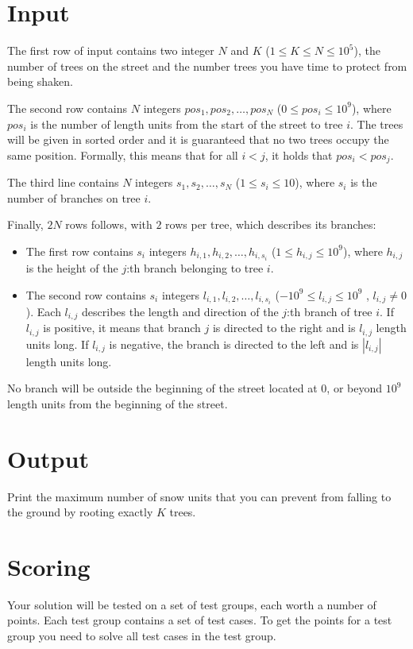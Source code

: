\section*{Input}
\noindent
The first row of input contains two integer $N$ and $K$ ($1 \leq K \leq N \leq 10^5$), the number of
trees on the street and the number trees you have time to protect from being shaken.

The second row contains $N$ integers $pos_1, pos_2, \dots, pos_N$ ($0 \leq pos_i \leq 10^9$), where
$pos_i$ is the number of length units from the start of the street to tree $i$.
The trees will be given in sorted order and it is guaranteed that no two trees occupy the same position.
Formally, this means that for all $i<j$, it holds that $pos_i < pos_j$.

The third line contains $N$ integers $s_1, s_2, \dots, s_N$ ($1 \leq s_i \leq 10$), where $s_i$ is the
number of branches on tree $i$.

Finally, $2N$ rows follows, with $2$ rows per tree, which describes its branches:
\begin{itemize}
  \item The first row contains $s_i$ integers $h_{i,1}, h_{i,2}, \dots, h_{i,s_i}$ ($1 \leq h_{i,j} \leq 10^9$), where $h_{i,j}$ is the height of the $j$:th branch belonging to tree $i$.
  \item The second row contains $s_i$ integers $l_{i,1}, l_{i,2}, \dots, l_{i,s_i}$ ($-10^9 \leq l_{i,j} \leq 10^9$ , $l_{i,j} \neq 0$). 
  Each $l_{i,j}$ describes the length and direction of the $j$:th branch of tree $i$. If $l_{i,j}$ is positive, it means that branch $j$ is directed to the right and is $l_{i,j}$ length units long. 
  If $l_{i,j}$ is negative, the branch is directed to the left and is $|l_{i,j}|$ length units long.
\end{itemize}

No branch will be outside the beginning of the street located at $0$, or beyond $10^9$ length units from the beginning of the street.

\section*{Output}
\noindent
Print the maximum number of snow units that you can prevent from falling to the ground by rooting exactly $K$ trees.

\section*{Scoring}
Your solution will be tested on a set of test groups, each worth a number of points. 
Each test group contains a set of test cases. 
To get the points for a test group you need to solve all test cases in the test group.

